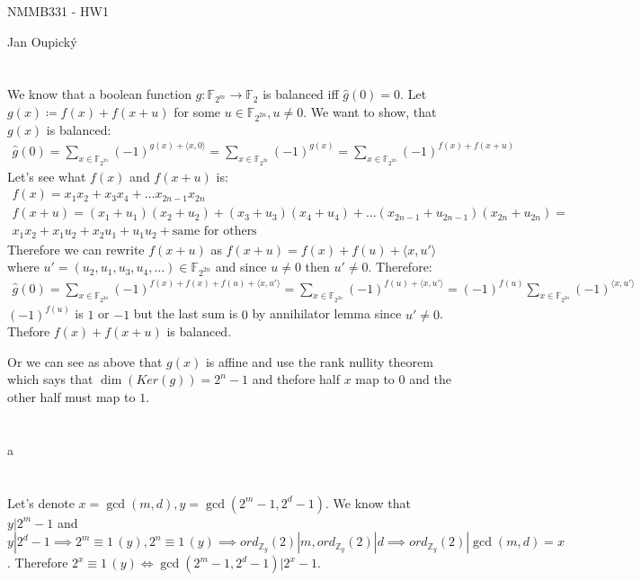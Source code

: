 \documentclass[12pt, a4paper]{article}
\begin{document}
\begin{center}
\large NMMB331 - HW1

\normalsize Jan Oupický
\end{center}
\vspace{1\baselineskip}

\section{}
We know that a boolean function $g: \mathbb{F}_{2^m} \rightarrow \mathbb{F}_2$ is balanced iff $\hat{g}(0) = 0$. Let $g(x) \coloneqq f(x)+f(x+u)$ for some $u \in \mathbb{F}_{2^{2n}}, u \neq 0$. We want to show, that $g(x)$ is balanced:
\begin{gather*}
\hat{g}(0) = \sum\limits_{x \in \mathbb{F}_{2^{2n}}} (-1)^{g(x)+\langle x,0 \rangle} = \sum\limits_{x \in \mathbb{F}_{2^{2n}}} (-1)^{g(x)} = \sum\limits_{x \in \mathbb{F}_{2^{2n}}} (-1)^{f(x)+f(x+u)}
\end{gather*}
Let's see what $f(x)$ and $f(x+u)$ is:
\begin{gather*}
f(x) = x_1 x_2 + x_3 x_4 + \dots x_{2n-1} x_{2n}\\
f(x+u) = (x_1+u_1) (x_2+u_2) + (x_3+u_3) (x_4+u_4) + \dots (x_{2n-1}+u_{2n-1}) (x_{2n}+u_{2n}) =\\
x_1 x_2 + x_1 u_2 + x_2 u_1 + u_1 u_2 + \text{same for others}
\end{gather*}
Therefore we can rewrite $f(x+u)$ as $f(x+u)=f(x)+f(u)+\langle x,u' \rangle$ where $u' = (u_2,u_1,u_3,u_4,\dots) \in \mathbb{F}_{2^{2n}}$ and since $u \neq 0$ then $u' \neq 0$. Therefore:
\begin{gather*}
\hat{g}(0) = \sum\limits_{x \in \mathbb{F}_{2^{2n}}} (-1)^{f(x)+f(x)+f(u)+\langle x,u' \rangle} = \sum\limits_{x \in \mathbb{F}_{2^{2n}}} (-1)^{f(u)+\langle x,u' \rangle} = (-1)^{f(u)}\sum\limits_{x \in \mathbb{F}_{2^{2n}}} (-1)^{\langle x,u' \rangle}
\end{gather*}
$(-1)^{f(u)}$ is $1$ or $-1$ but the last sum is $0$ by annihilator lemma since $u' \neq 0$. Thefore $f(x)+f(x+u)$ is balanced.

Or we can see as above that $g(x)$ is affine and use the rank nullity theorem which says that $\dim(Ker(g)) = 2^n-1$ and thefore half $x$ map to $0$ and the other half must map to $1$.
\section{}
a

\section{}
Let's denote $x = \gcd(m,d), y = \gcd(2^m-1, 2^d-1)$. We know that $y | 2^m-1$ and $y | 2^d-1 \implies 2^m \equiv 1 \, (y), 2^n \equiv 1 \, (y) \implies ord_{\mathbb{Z}_y}(2)|m, ord_{\mathbb{Z}_y}(2)|d \implies ord_{\mathbb{Z}_y}(2)|\gcd(m,d)=x$. Therefore $2^x \equiv 1 \, (y) \iff \gcd(2^m-1, 2^d-1) | 2^x-1$.
\end{document}
